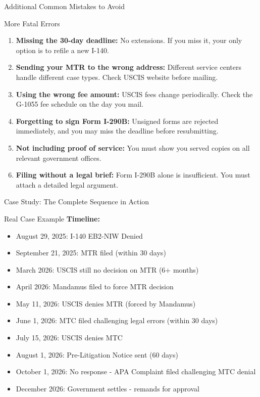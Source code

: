 \documentclass[11pt]{beamer}
\begin{document}
	\begin{frame}{Additional Common Mistakes to Avoid}
		\scriptsize
		\begin{block}{More Fatal Errors}
			\begin{enumerate}
				\item \textbf{Missing the 30-day deadline:} No extensions. If you miss it, your only option is to refile a new I-140.
				\item \textbf{Sending your MTR to the wrong address:} Different service centers handle different case types. Check USCIS website before mailing.
				\item \textbf{Using the wrong fee amount:} USCIS fees change periodically. Check the G-1055 fee schedule on the day you mail.
				\item \textbf{Forgetting to sign Form I-290B:} Unsigned forms are rejected immediately, and you may miss the deadline before resubmitting.
				\item \textbf{Not including proof of service:} You must show you served copies on all relevant government offices.
				\item \textbf{Filing without a legal brief:} Form I-290B alone is insufficient. You must attach a detailed legal argument.
			\end{enumerate}
		\end{block}
	\end{frame}
	
	
	\begin{frame}{Case Study: The Complete Sequence in Action}
		\scriptsize
		\begin{block}{Real Case Example}
			\textbf{Timeline:}
			\begin{itemize}
				\item August 29, 2025: I-140 EB2-NIW Denied
				\item September 21, 2025: MTR filed (within 30 days)
				\item March 2026: USCIS still no decision on MTR (6+ months)
				\item April 2026: Mandamus filed to force MTR decision
				\item May 11, 2026: USCIS denies MTR (forced by Mandamus)
				\item June 1, 2026: MTC filed challenging legal errors (within 30 days)
				\item July 15, 2026: USCIS denies MTC
				\item August 1, 2026: Pre-Litigation Notice sent (60 days)
				\item October 1, 2026: No response - APA Complaint filed challenging MTC denial
				\item December 2026: Government settles - remands for approval
			\end{itemize}
		\end{block}
	\end{frame}
	
\end{document}
